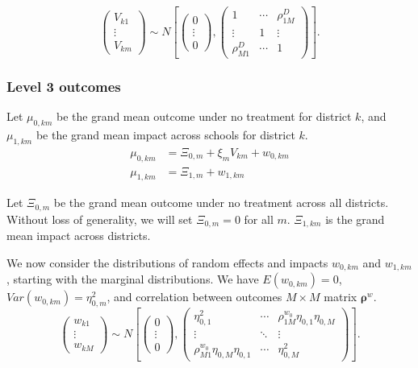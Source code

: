 \documentclass[12pt]{article}
\newcommand\mb[1]{\boldsymbol{#1}}
\begin{document}
\[ \left(
\begin{array}{c}
V_{k1}	\\
\vdots 	\\
V_{km}
\end{array}\right)
\sim
N\left[\left(
\begin{array}{c}
0		\\
\vdots 	\\
0
\end{array}\right),\left(
\begin{array}{ccc}
1 				& \cdots	& \rho^D_{1M}	\\
\vdots 			& 1			& \vdots 	\\
\rho^D_{M1}  	& \cdots	& 1
\end{array}
\right)\right].\]

\subsubsection{Level 3 outcomes}
\label{sec:level3_outcomes}

Let $\mu_{0,km}$ be the grand mean outcome under no treatment for district $k$, and
$\mu_{1,km}$ be the grand mean impact across schools for district $k$.
\begin{align}
\mu_{0,km} 	&= \Xi_{0,m} + \xi_{m} V_{km} + w_{0,km}  \\
\mu_{1,km} 	&= \Xi_{1,m} + w_{1,km}
\end{align}

Let $\Xi_{0,m}$ be the grand mean outcome under no treatment across all districts.
Without loss of generality, we will set $\Xi_{0,m} = 0$ for all $m$.
$\Xi_{1,km}$ is the grand mean impact across districts.

We now consider the distributions of random effects and impacts $w_{0,km}$ and $w_{1,km}$, starting with the marginal distributions.
We have $E(w_{0,km}) = 0$, $Var(w_{0,km}) = \eta_{0,m}^2$, and correlation between outcomes $M \times M$ matrix $\mb{\rho}^w$.
\[ \left(
\begin{array}{c}
w_{k1}	\\
\vdots 	\\
w_{kM}
\end{array}\right)
\sim
N\left[\left(
\begin{array}{c}
0		\\
\vdots 	\\
0
\end{array}\right),\left(
\begin{array}{ccc}
\eta_{0,1}^2						& \cdots		& \rho^{w_0}_{1M} \eta_{0,1} \eta_{0,M}	\\
\vdots 								& \ddots		& \vdots 	\\
\rho^{w_0}_{M1} \eta_{0,M} \eta_{0,1}  	& \cdots		& \eta_{0,M}^2
\end{array}
\right)\right].\]
\end{document}
